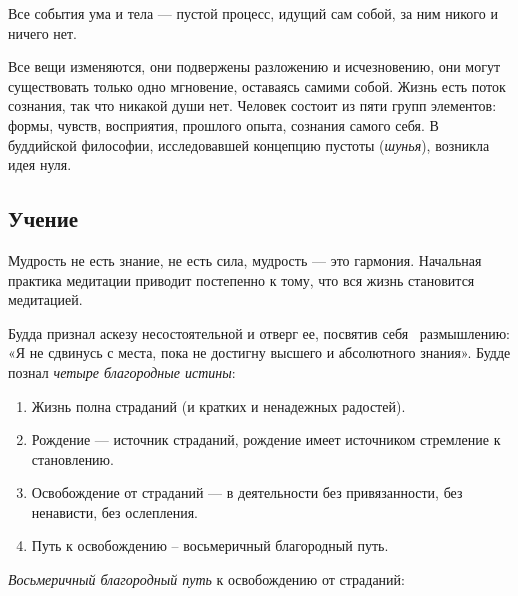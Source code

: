\documentclass[a4paper]{article}
\newcommand\liststyleWWviiiNumx{%
\renewcommand\theenumi{\arabic{enumi}}
\renewcommand\theenumii{\alph{enumii}}
\renewcommand\theenumiii{\roman{enumiii}}
\renewcommand\theenumiv{\arabic{enumiv}}
\renewcommand\labelenumi{\theenumi.}
\renewcommand\labelenumii{\theenumii.}
\renewcommand\labelenumiii{\theenumiii.}
\renewcommand\labelenumiv{\theenumiv.}
}
\begin{document}
{
Все события ума и тела — пустой процесс, идущий сам собой, за ним никого и ничего нет. }

{
Все вещи изменяются, они подвержены разложению и исчезновению, они могут существовать только одно мгновение, оставаясь
самими собой. Жизнь есть поток сознания, так что никакой души нет. Человек состоит из пяти групп элементов: формы,
чувств, восприятия, прошлого опыта, сознания самого себя. В буддийской философии, исследовавшей концепцию пустоты
(\textit{шунья}), возникла идея нуля. }

\subsection[Учение]{ Учение}
{
Мудрость не есть знание, не есть сила, мудрость — это гармония. Начальная практика медитации приводит постепенно к тому,
что вся жизнь становится медитацией.}

{
Будда признал аскезу несостоятельной и отверг ее, посвятив себя \ размышлению: «Я не сдвинусь с места, пока не достигну
высшего и абсолютного знания». Будде познал \textit{четыре благородные истины}:}

\liststyleWWviiiNumx
\begin{enumerate}
\item {
Жизнь полна страданий (и кратких и ненадежных радостей).}
\item {
Рождение — источник страданий, рождение имеет источником стремление к становлению.}
\item {
Освобождение от страданий — в деятельности без привязанности, без ненависти, без ослепления.}
\item {
Путь к освобождению – восьмеричный благородный путь.}
\end{enumerate}
{
\textit{Восьмеричный благородный путь} к освобождению от страданий:}
\end{document}
